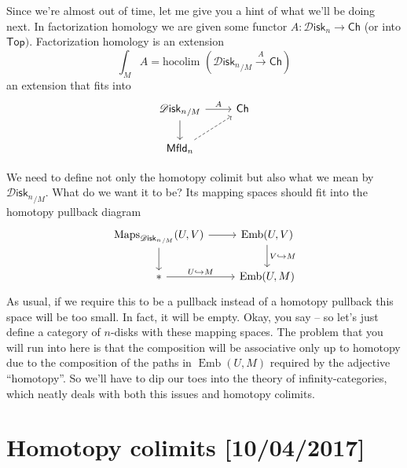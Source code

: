 \documentclass{amsart}
\DeclareMathOperator{\Emb}{Emb}
\newcommand{\Disk}{\mathscr{D}\mathsf{isk}_n}
\begin{document}
Since we're almost out of time, let me give you a hint of what we'll be doing next.
In factorization homology we are given some functor $A:\Disk\to\mathsf{Ch}$ (or
into $\mathsf{Top}).$ Factorization homology is an extension
\begin{equation*}
    \int_M A = \text{hocolim } ( {\Disk}_{/M}\xrightarrow{A} \mathsf{Ch})
\end{equation*}
an extension that fits into
\begin{equation*}
    \begin{tikzcd}
        {\Disk}_{/M} \rar{A} \dar & \mathsf{Ch} \\
        \mathsf{Mfld}_n \ar[ur,dashed] &
    \end{tikzcd}
\end{equation*}

We need to define not only the homotopy colimit but also what we mean by ${\Disk}_{/M}$.
What do we want it to be? Its mapping spaces should fit into the homotopy
pullback diagram
\begin{equation*}
    \begin{tikzcd}
        \Maps_{ {\Disk}_{/M}}(U,V) \rar\dar & \Emb(U,V)\dar{V\hookrightarrow M} \\
        * \rar{U\hookrightarrow M} & \Emb(U,M)
    \end{tikzcd}
\end{equation*}
As usual, if we require this to be a pullback instead of a homotopy pullback this
space will be too small. In fact, it will be empty.
Okay, you say -- so let's just define a category of $n$-disks with these mapping spaces.
The problem that you will run into here is that the composition will be associative only up to homotopy
due to the composition of the paths in $\Emb(U,M)$ required by the adjective ``homotopy''.
So we'll have to dip our toes into the theory of infinity-categories, which neatly
deals with both this issues and homotopy colimits.

\newpage

\section{Homotopy colimits [10/04/2017]}
\end{document}
